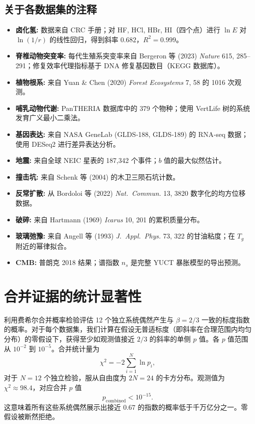 \documentclass[11pt,a4paper]{article}
\begin{document}
	\subsection*{关于各数据集的注释}
	\begin{itemize}
		\item \textbf{卤化氢:} 数据来自 CRC 手册；对 HF, HCl, HBr, HI（四个点）进行 \(\ln E\) 对 \(\ln(1/r)\) 的线性回归，得到斜率 \(0.682\)，\(R^2=0.999\)。
		\item \textbf{脊椎动物突变率:} 每代生殖系突变率来自 Bergeron 等 (2023) \textit{Nature} 615, 285–291；修复效率代理指标基于 DNA 修复基因数目（KEGG 数据库）。
		\item \textbf{植物根系:} 来自 Yuan \& Chen (2020) \textit{Forest Ecosystems} 7, 58 的 1016 次观测。
		\item \textbf{哺乳动物代谢:} PanTHERIA 数据库中的 379 个物种；使用 VertLife 树的系统发育广义最小二乘法。
		\item \textbf{基因表达:} 来自 NASA GeneLab (GLDS‑188, GLDS‑189) 的 RNA‑seq 数据；使用 DESeq2 进行差异表达分析。
		\item \textbf{地震:} 来自全球 NEIC 星表的 187,342 个事件；\(b\) 值的最大似然估计。
		\item \textbf{撞击坑:} 来自 Schenk 等 (2004) 的木卫三陨石坑计数。
		\item \textbf{反常扩散:} 从 Bordoloi 等 (2022) \textit{Nat.\ Commun.} 13, 3820 数字化的均方位移数据。
		\item \textbf{破碎:} 来自 Hartmann (1969) \textit{Icarus} 10, 201 的累积质量分布。
		\item \textbf{玻璃弛豫:} 来自 Angell 等 (1993) \textit{J.\ Appl.\ Phys.} 73, 322 的甘油粘度；在 \(T_g\) 附近的幂律拟合。
		\item \textbf{CMB:} 普朗克 2018 结果；谱指数 \(n_s\) 是完整 YUCT 暴胀模型的导出预测。
	\end{itemize}
	
	\section{合并证据的统计显著性}
	
	利用费希尔合并概率检验评估 12 个独立系统偶然产生与 \(\beta = 2/3\) 一致的标度指数的概率。对于每个数据集，我们计算在假设无普适标度（即斜率在合理范围内均匀分布）的零假设下，获得至少如观测值接近 \(2/3\) 的斜率的单侧 \(p\) 值。各 \(p\) 值范围从 \(10^{-2}\) 到 \(10^{-5}\)。合并统计量为
	\[
	\chi^2 = -2\sum_{i=1}^{N} \ln p_i,
	\]
	对于 \(N=12\) 个独立检验，服从自由度为 \(2N = 24\) 的卡方分布。观测值为 \(\chi^2 \approx 98.4\)，对应合并 \(p\) 值
	\[
	p_{\mathrm{combined}} < 10^{-15}.
	\]
	这意味着所有这些系统偶然展示出接近 \(0.67\) 的指数的概率低于千万亿分之一。零假设被断然拒绝。
	
\end{document}
